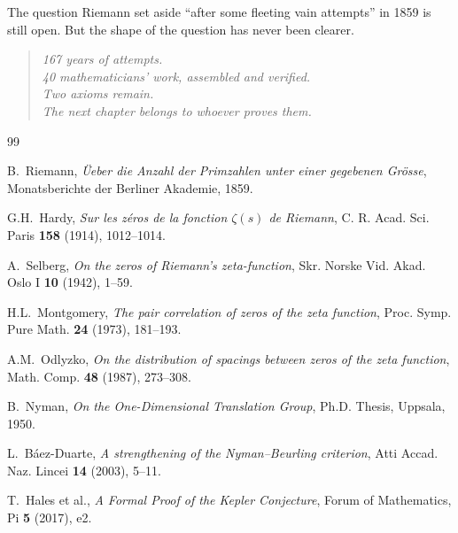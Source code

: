 \documentclass[11pt,a4paper]{article}
\begin{document}
The question Riemann set aside ``after some fleeting vain attempts''
in 1859 is still open. But the shape of the question has never
been clearer.

\begin{quote}
\emph{167 years of attempts.\\
40 mathematicians' work, assembled and verified.\\
Two axioms remain.\\
The next chapter belongs to whoever proves them.}
\end{quote}

\begin{thebibliography}{99}

B.~Riemann, \emph{\"Ueber die Anzahl der Primzahlen unter einer
gegebenen Gr\"osse}, Monatsberichte der Berliner Akademie, 1859.

G.H.~Hardy, \emph{Sur les z\'eros de la fonction $\zeta(s)$ de
Riemann}, C. R. Acad. Sci. Paris \textbf{158} (1914), 1012--1014.

A.~Selberg, \emph{On the zeros of Riemann's zeta-function},
Skr. Norske Vid. Akad. Oslo I \textbf{10} (1942), 1--59.

H.L.~Montgomery, \emph{The pair correlation of zeros of the zeta
function}, Proc. Symp. Pure Math. \textbf{24} (1973), 181--193.

A.M.~Odlyzko, \emph{On the distribution of spacings between zeros
of the zeta function}, Math. Comp. \textbf{48} (1987), 273--308.

B.~Nyman, \emph{On the One-Dimensional Translation Group},
Ph.D. Thesis, Uppsala, 1950.

L.~B\'aez-Duarte, \emph{A strengthening of the Nyman--Beurling
criterion}, Atti Accad. Naz. Lincei \textbf{14} (2003), 5--11.

T.~Hales et al., \emph{A Formal Proof of the Kepler Conjecture},
Forum of Mathematics, Pi \textbf{5} (2017), e2.

\end{thebibliography}
\end{document}
